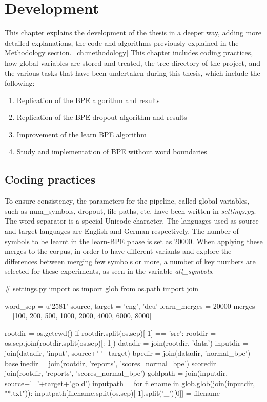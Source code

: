 %
%

\chapter{Development}\label{ch:development}

This chapter explains the development of the thesis in a deeper way, adding more detailed explanations, the code and algorithms previously explained in the Methodology section.~\ref{ch:methodology} This chapter includes coding practices, how global variables are stored and treated, the tree directory of the project, and the various tasks that have been undertaken during this thesis, which include the following:

\begin{enumerate}
  \item Replication of the BPE algorithm and results
  \item Replication of the BPE-dropout algorithm and results
  \item Improvement of the learn BPE algorithm
  \item Study and implementation of BPE without word boundaries
\end{enumerate}

\section{Coding practices}

To ensure consistency, the parameters for the pipeline, called global variables, such as num\_symbols, dropout, file paths, etc. have been written in \emph{settings.py}. The word separator is a special Unicode character. The languages used as source and target languages are English and German respectively. The number of symbols to be learnt in the learn-BPE phase is set as 20000. When applying these merges to the corpus, in order to have different variants and explore the differences between merging few symbols or more, a number of key numbers are selected for these experiments, as seen in the variable \emph{all\_symbols}.

\begin{python}
# settings.py
import os
import glob
from os.path import join

word_sep = u'\u2581'
source, target = 'eng', 'deu'
learn_merges = 20000
merges = [100, 200, 500, 1000, 2000, 4000, 6000, 8000]

rootdir = os.getcwd()
if rootdir.split(os.sep)[-1] == 'src':
    rootdir = os.sep.join(rootdir.split(os.sep)[:-1])
datadir = join(rootdir, 'data')
inputdir = join(datadir, 'input', source+'-'+target)
bpedir = join(datadir, 'normal_bpe')
baselinedir = join(rootdir, 'reports', 'scores_normal_bpe')
scoredir = join(rootdir, 'reports', 'scores_normal_bpe')
goldpath = join(inputdir, source+'_'+target+'.gold')
inputpath = {}
for filename in glob.glob(join(inputdir, "*.txt")):
  inputpath[filename.split(os.sep)[-1].split('_')[0]] = filename
\end{python}

